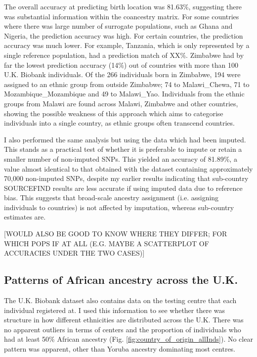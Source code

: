 The overall accuracy at predicting birth location was 81.63\%, suggesting there was substantial information within the coancestry matrix. For some countries where there was large number of surrogate populations, such as Ghana and Nigeria, the prediction accuracy was high. For certain countries, the prediction accuracy was much lower. For example, Tanzania, which is only represented by a single reference population, had a prediction match of XX\%. Zimbabwe had by far the lowest prediction accuracy (14\%) out of countries with more than 100 U.K. Biobank individuals. Of the 266 individuals born in Zimbabwe, 194 were assigned to an ethnic group from outside Zimbabwe; 74 to Malawi\_Chewa, 71 to Mozambique\_Mozambique and 49 to Malawi\_Yao. Individuals from the ethnic groups from Malawi are found across Malawi, Zimbabwe and other countries, showing the possible weakness of this approach which aims to categorise individuals into a single country, as ethnic groups often transcend countries. 

I also performed the same analysis but using the data which had been imputed. This stands as a practical test of whether it is preferable to impute or retain a smaller number of non-imputed SNPs. This yielded an accuracy of 81.89\%, a value almost identical to that obtained with the dataset containing approximately 70,000 non-imputed SNPs, despite my earlier results indicating that sub-country SOURCEFIND results are less accurate if using imputed data due to reference bias. This suggests that broad-scale ancestry assignment (i.e. assigning individuals to countries) is not affected by imputation, whereas sub-country estimates are. 

{\color{red}[WOULD ALSO BE GOOD TO KNOW WHERE THEY DIFFER; FOR WHICH POPS IF AT ALL (E.G. MAYBE A SCATTERPLOT OF ACCURACIES UNDER THE TWO CASES)]}


\subsection{Patterns of African ancestry across the U.K.}

The U.K. Biobank dataset also contains data on the testing centre that each individual registered at. I used this information to see whether there was structure in how different ethnicities are distributed across the U.K. There was no apparent outliers in terms of centers and the proportion of individuals who had at least 50\% African ancestry (Fig. \ref{fig:country_of_origin_allInds}). No clear pattern was apparent, other than Yoruba ancestry dominating most centres. 
 
